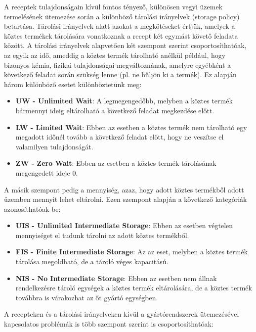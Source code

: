 A receptek tulajdonságain kívül fontos tényező, különösen vegyi üzemek termelésének ütemezése során a különböző tárolási irányelvek (storage policy) betartása.\cite{phd_Hegyhati}
Tárolási irányelvek alatt azokat a megkötéseket értjük, amelyek a köztes termékek tárolására vonatkoznak a recept két egymást követő feladata között.
A tárolási irányelvek alapvetően két szempont szerint csoportosíthatóak, az egyik az idő, ameddig a köztes termék tárolható anélkül például, hogy bizonyos kémia, fizikai tulajdonságai megváltoznának, amelyre egyébként a következő feladat során szükség lenne (pl. ne hűljön ki a termék).
Ez alapján három különböző esetet különböztetünk meg:
\begin{itemize}
\item[]\textbf{UW - Unlimited Wait}: A legmegengedőbb, melyben a köztes termék bármennyi ideig eltárolható a következő feladat megkezdése előtt.
\item[]\textbf{LW - Limited Wait}: Ebben az esetben a köztes termék nem tárolható egy megadott időnél tovább a következő feladat előtt, hogy ne veszítse el valamilyen tulajdonságát.
\item[]\textbf{ZW - Zero Wait}: Ebben az esetben a köztes termék tárolásának megengedett ideje 0.
\end{itemize}
A másik szempont pedig a mennyiség, azaz, hogy adott köztes termékből adott üzemben mennyit lehet eltárolni.
Ezen szempont alapján a következő kategóriák azonosíthatóak be:
\begin{itemize}
\item[]\textbf{UIS - Unlimited Intermediate Storage}: Ebben az esetben végtelen mennyiséget el tudunk tárolni az adott köztes termékből.
\item[]\textbf{FIS - Finite Intermediate Storage}: Az az eset, melyben a köztes termék tárolása megoldható, de a tároló véges kapacitású.
\item[]\textbf{NIS - No Intermediate Storage}: Ebben az esetben nem állnak rendelkezésre tároló egységek a köztes termék eltárolására, de a köztes termék továbbra is várakozhat az őt gyártó egységben.
\end{itemize}
A recepteken és a tárolási irányelveken kívül a gyártórendszerek ütemezésével kapcsolatos problémák is több szempont szerint is csoportosíthatóak\cite{phd_Hegyhati}:
